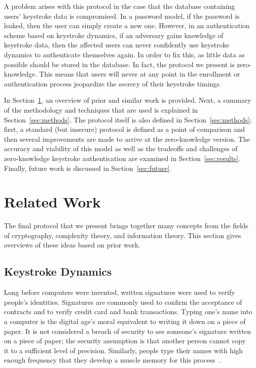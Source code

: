 \documentclass[11pt]{article}
\begin{document}
A problem arises with this protocol in the case that the database containing users' keystroke data is compromised. In a password model, if the password is leaked, then the user can simply create a new one. However, in an authentication scheme based on keystroke dynamics, if an adversary gains knowledge of keystroke data, then the affected users can never confidently use keystroke dynamics to authenticate themselves again. In order to fix this, as little data as possible should be stored in the database. In fact, the protocol we present is zero-knowledge. This means that users will never at any point in the enrollment or authentication process jeopardize the secrecy of their keystroke timings.

In Section~\ref{sec:related}, an overview of prior and similar work is provided. Next, a summary of the methodology and techniques that are used is explained in Section~\ref{sec:methods}. The protocol itself is also defined in Section~\ref{sec:methods}; first, a standard (but insecure) protocol is defined as a point of comparison and then several improvements are made to arrive at the zero-knowledge version. The accuracy and viability of this model as well as the tradeoffs and challenges of zero-knowledge keystroke authentication are examined in Section~\ref{sec:results}. Finally, future work is discussed in Section~\ref{sec:future}.

\section{Related Work}
\label{sec:related}
The final protocol that we present brings together many concepts from the fields of cryptography, complexity theory, and information theory. This section gives overviews of these ideas based on prior work.

\subsection{Keystroke Dynamics}
\label{sec:bg-keystroke}
Long before computers were invented, written signatures were used to verify people's identities. Signatures are commonly used to confirm the acceptance of contracts and to verify credit card and bank transactions. Typing one's name into a computer is the digital age's moral equivalent to writing it down on a piece of paper. It is not considered a breach of security to see someone's signature written on a piece of paper; the security assumption is that another person cannot copy it to a sufficient level of precision. Similarly, people type their names with high enough frequency that they develop a muscle memory for this process~\cite{monrose:authentication}.
\end{document}
